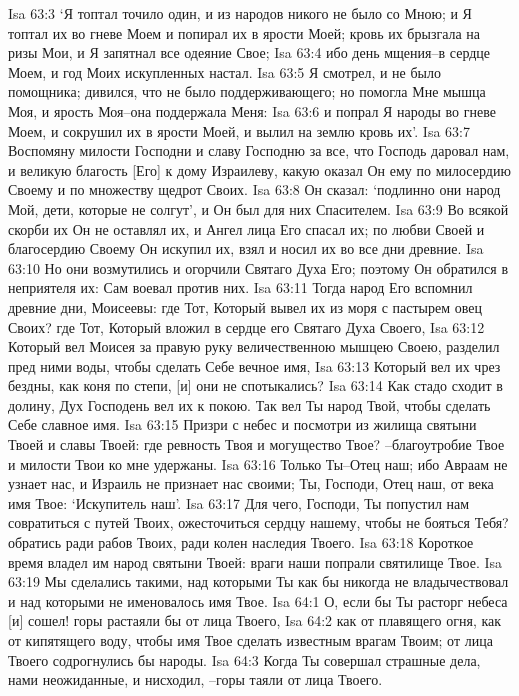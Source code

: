 Isa 63:3  `Я топтал точило один, и из народов никого не было со Мною; и Я топтал их во гневе Моем и попирал их в ярости Моей; кровь их брызгала на ризы Мои, и Я запятнал все одеяние Свое;
Isa 63:4  ибо день мщения--в сердце Моем, и год Моих искупленных настал.
Isa 63:5  Я смотрел, и не было помощника; дивился, что не было поддерживающего; но помогла Мне мышца Моя, и ярость Моя--она поддержала Меня:
Isa 63:6  и попрал Я народы во гневе Моем, и сокрушил их в ярости Моей, и вылил на землю кровь их'.
Isa 63:7  Воспомяну милости Господни и славу Господню за все, что Господь даровал нам, и великую благость [Его] к дому Израилеву, какую оказал Он ему по милосердию Своему и по множеству щедрот Своих.
Isa 63:8  Он сказал: `подлинно они народ Мой, дети, которые не солгут', и Он был для них Спасителем.
Isa 63:9  Во всякой скорби их Он не оставлял их, и Ангел лица Его спасал их; по любви Своей и благосердию Своему Он искупил их, взял и носил их во все дни древние.
Isa 63:10  Но они возмутились и огорчили Святаго Духа Его; поэтому Он обратился в неприятеля их: Сам воевал против них.
Isa 63:11  Тогда народ Его вспомнил древние дни, Моисеевы: где Тот, Который вывел их из моря с пастырем овец Своих? где Тот, Который вложил в сердце его Святаго Духа Своего,
Isa 63:12  Который вел Моисея за правую руку величественною мышцею Своею, разделил пред ними воды, чтобы сделать Себе вечное имя,
Isa 63:13  Который вел их чрез бездны, как коня по степи, [и] они не спотыкались?
Isa 63:14  Как стадо сходит в долину, Дух Господень вел их к покою. Так вел Ты народ Твой, чтобы сделать Себе славное имя.
Isa 63:15  Призри с небес и посмотри из жилища святыни Твоей и славы Твоей: где ревность Твоя и могущество Твое? --благоутробие Твое и милости Твои ко мне удержаны.
Isa 63:16  Только Ты--Отец наш; ибо Авраам не узнает нас, и Израиль не признает нас своими; Ты, Господи, Отец наш, от века имя Твое: `Искупитель наш'.
Isa 63:17  Для чего, Господи, Ты попустил нам совратиться с путей Твоих, ожесточиться сердцу нашему, чтобы не бояться Тебя? обратись ради рабов Твоих, ради колен наследия Твоего.
Isa 63:18  Короткое время владел им народ святыни Твоей: враги наши попрали святилище Твое.
Isa 63:19  Мы сделались такими, над которыми Ты как бы никогда не владычествовал и над которыми не именовалось имя Твое.
Isa 64:1  О, если бы Ты расторг небеса [и] сошел! горы растаяли бы от лица Твоего,
Isa 64:2  как от плавящего огня, как от кипятящего воду, чтобы имя Твое сделать известным врагам Твоим; от лица Твоего содрогнулись бы народы.
Isa 64:3  Когда Ты совершал страшные дела, нами неожиданные, и нисходил, --горы таяли от лица Твоего.
